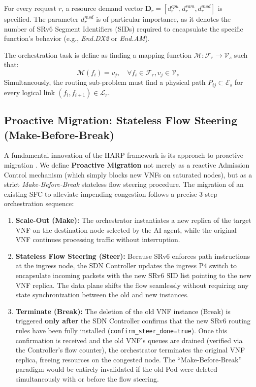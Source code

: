 \documentclass[12pt, a4paper, reqno, oneside]{book}
\begin{document}
For every request $r$, a resource demand vector $\mathbf{D}_r = [d_r^{cpu}, d_r^{ram}, d_r^{msd}]$ is specified. The parameter $d_r^{msd}$ is of particular importance, as it denotes the number of SRv6 Segment Identifiers (SIDs) required to encapsulate the specific function's behavior (e.g., \textit{End.DX2} or \textit{End.AM}).

The orchestration task is define as finding a mapping function $\mathcal{M}: \mathcal{F}_r \to \mathcal{V}_s$ such that:
\begin{equation}
\mathcal{M}(f_i) = v_j, \quad \forall f_i \in \mathcal{F}_r, v_j \in \mathcal{V}_s
\end{equation}
Simultaneously, the routing sub-problem must find a physical path $P_{ij} \subset \mathcal{E}_s$ for every logical link $(f_i, f_{i+1}) \in \mathcal{L}_r$.

\subsection{Proactive Migration: Stateless Flow Steering (Make-Before-Break)}
A fundamental innovation of the HARP framework is its approach to proactive migration \cite{moshiri2026proactive}. We define \textbf{Proactive Migration} not merely as a reactive Admission Control mechanism (which simply blocks new VNFs on saturated nodes), but as a strict \textit{Make-Before-Break} stateless flow steering procedure. The migration of an existing SFC to alleviate impending congestion follows a precise 3-step orchestration sequence:

\begin{enumerate}
    \item \textbf{Scale-Out (Make):} The orchestrator instantiates a new replica of the target VNF on the destination node selected by the AI agent, while the original VNF continues processing traffic without interruption.
    \item \textbf{Stateless Flow Steering (Steer):} Because SRv6 enforces path instructions at the ingress node, the SDN Controller updates the ingress P4 switch to encapsulate incoming packets with the new SRv6 SID list pointing to the new VNF replica. The data plane shifts the flow seamlessly without requiring any state synchronization between the old and new instances.
    \item \textbf{Terminate (Break):} The deletion of the old VNF instance (Break) is triggered \textbf{only after} the SDN Controller confirms that the new SRv6 routing rules have been fully installed (\texttt{confirm\_steer\_done=true}). Once this confirmation is received and the old VNF's queues are drained (verified via the Controller's flow counter), the orchestrator terminates the original VNF replica, freeing resources on the congested node. The ``Make-Before-Break'' paradigm would be entirely invalidated if the old Pod were deleted simultaneously with or before the flow steering.
\end{enumerate}
\end{document}
